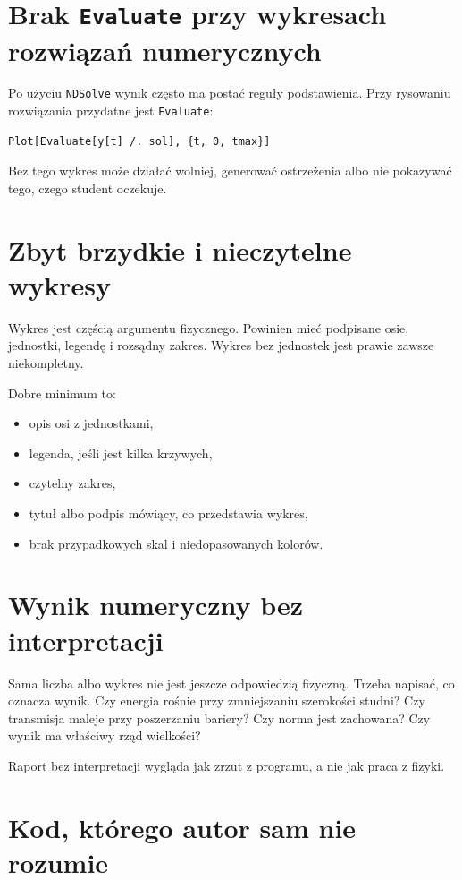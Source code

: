 \section{Brak \texttt{Evaluate} przy wykresach rozwiązań numerycznych}

Po użyciu \texttt{NDSolve} wynik często ma postać reguły podstawienia. Przy rysowaniu
rozwiązania przydatne jest \texttt{Evaluate}:
\begin{verbatim}
Plot[Evaluate[y[t] /. sol], {t, 0, tmax}]
\end{verbatim}
Bez tego wykres może działać wolniej, generować ostrzeżenia albo nie pokazywać
tego, czego student oczekuje.

\section{Zbyt brzydkie i nieczytelne wykresy}

Wykres jest częścią argumentu fizycznego. Powinien mieć podpisane osie, jednostki,
legendę i rozsądny zakres. Wykres bez jednostek jest prawie zawsze niekompletny.

Dobre minimum to:
\begin{itemize}
    \item opis osi z jednostkami,
    \item legenda, jeśli jest kilka krzywych,
    \item czytelny zakres,
    \item tytuł albo podpis mówiący, co przedstawia wykres,
    \item brak przypadkowych skal i niedopasowanych kolorów.
\end{itemize}

\section{Wynik numeryczny bez interpretacji}

Sama liczba albo wykres nie jest jeszcze odpowiedzią fizyczną. Trzeba napisać, co
oznacza wynik. Czy energia rośnie przy zmniejszaniu szerokości studni? Czy
transmisja maleje przy poszerzaniu bariery? Czy norma jest zachowana? Czy wynik
ma właściwy rząd wielkości?

Raport bez interpretacji wygląda jak zrzut z programu, a nie jak praca z fizyki.

\section{Kod, którego autor sam nie rozumie}

